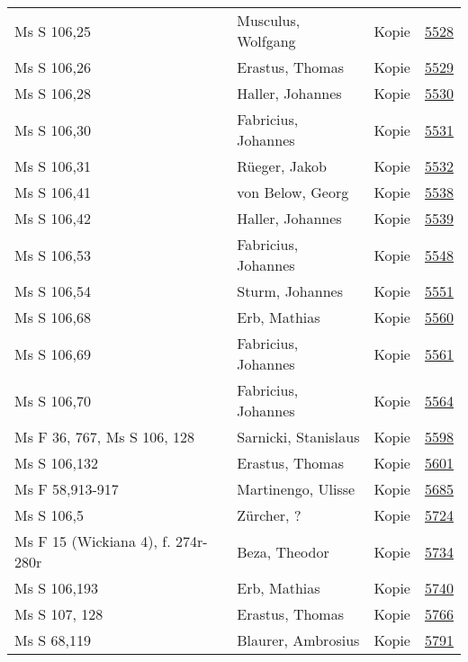 \documentclass[10pt,a4paper,landscape]{report}
\begin{document}
\begin{longtable}{p{16cm}p{4cm}lr}
Ms S 106,25	&	Musculus, Wolfgang	&	Kopie	&	\href{http://130.60.24.72/assignment/5528}{5528}\\
Ms S 106,26	&	Erastus, Thomas	&	Kopie	&	\href{http://130.60.24.72/assignment/5529}{5529}\\
Ms S 106,28	&	Haller, Johannes	&	Kopie	&	\href{http://130.60.24.72/assignment/5530}{5530}\\
Ms S 106,30	&	Fabricius, Johannes	&	Kopie	&	\href{http://130.60.24.72/assignment/5531}{5531}\\
Ms S 106,31	&	Rüeger, Jakob	&	Kopie	&	\href{http://130.60.24.72/assignment/5532}{5532}\\
Ms S 106,41	&	von Below, Georg	&	Kopie	&	\href{http://130.60.24.72/assignment/5538}{5538}\\
Ms S 106,42	&	Haller, Johannes	&	Kopie	&	\href{http://130.60.24.72/assignment/5539}{5539}\\
Ms S 106,53	&	Fabricius, Johannes	&	Kopie	&	\href{http://130.60.24.72/assignment/5548}{5548}\\
Ms S 106,54	&	Sturm, Johannes	&	Kopie	&	\href{http://130.60.24.72/assignment/5551}{5551}\\
Ms S 106,68	&	Erb, Mathias	&	Kopie	&	\href{http://130.60.24.72/assignment/5560}{5560}\\
Ms S 106,69	&	Fabricius, Johannes	&	Kopie	&	\href{http://130.60.24.72/assignment/5561}{5561}\\
Ms S 106,70	&	Fabricius, Johannes	&	Kopie	&	\href{http://130.60.24.72/assignment/5564}{5564}\\
Ms F 36, 767, Ms S 106, 128	&	Sarnicki, Stanislaus	&	Kopie	&	\href{http://130.60.24.72/assignment/5598}{5598}\\
Ms S 106,132	&	Erastus, Thomas	&	Kopie	&	\href{http://130.60.24.72/assignment/5601}{5601}\\
Ms F 58,913-917	&	Martinengo, Ulisse	&	Kopie	&	\href{http://130.60.24.72/assignment/5685}{5685}\\
Ms S 106,5	&	Zürcher, ?	&	Kopie	&	\href{http://130.60.24.72/assignment/5724}{5724}\\
Ms F 15 (Wickiana 4), f. 274r-280r	&	Beza, Theodor	&	Kopie	&	\href{http://130.60.24.72/assignment/5734}{5734}\\
Ms S 106,193	&	Erb, Mathias	&	Kopie	&	\href{http://130.60.24.72/assignment/5740}{5740}\\
Ms S 107, 128	&	Erastus, Thomas	&	Kopie	&	\href{http://130.60.24.72/assignment/5766}{5766}\\
Ms S 68,119	&	Blaurer, Ambrosius	&	Kopie	&	\href{http://130.60.24.72/assignment/5791}{5791}\\

\end{longtable}
\end{document}
